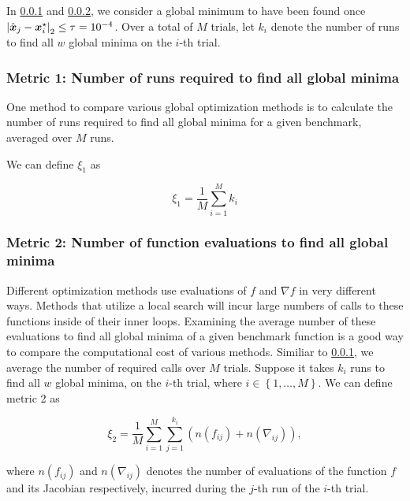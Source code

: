 In \cref{metric1} and \cref{metric2}, we consider a global minimum to have been found once 
$\left|\hat{\boldsymbol{x}}_j - \boldsymbol{x}^\star_i\right|_2 \leq \tau = 10^{-4}$. Over a total of $M$ trials, let
$k_i$ denote the number of runs to find all $w$ global minima on the $i$-th trial.

\subsubsection{Metric 1: Number of runs required to find all global minima}\label{metric1}

One method to compare various global optimization methods is to calculate the number of runs required to find all
global minima for a given benchmark, averaged over $M$ runs.

We can define $\xi_1$ as

$$
\xi_1 = \frac{1}{M} \sum_{i=1}^M k_i 
$$

\subsubsection{Metric 2: Number of function evaluations to find all global minima}\label{metric2}

Different optimization methods use evaluations of $f$ and $\nabla f$ in very different ways. Methods that utilize a
local search will incur large numbers of calls to these functions inside of their inner loops. Examining the average
number of these evaluations to find all global minima of a given benchmark function is a good way to compare the
computational cost of various methods. Similiar to \cref{metric1}, we average the number of required calls over
$M$ trials. Suppose it takes $k_i$ runs to find all $w$ global minima, on the $i$-th trial, 
where $i\in\left\lbrace 1,\ldots, M\right\rbrace$. We can define metric 2 as

$$
\xi_2 = \frac{1}{M}\sum_{i=1}^M \sum_{j=1}^{k_i} \left( n(f_{ij}) + n(\nabla_{ij}) \right),
$$

where $n(f_{ij})$ and $n(\nabla_{ij})$ denotes the number of evaluations of the function $f$ and its Jacobian respectively,
incurred during the $j$-th run of the $i$-th trial.
